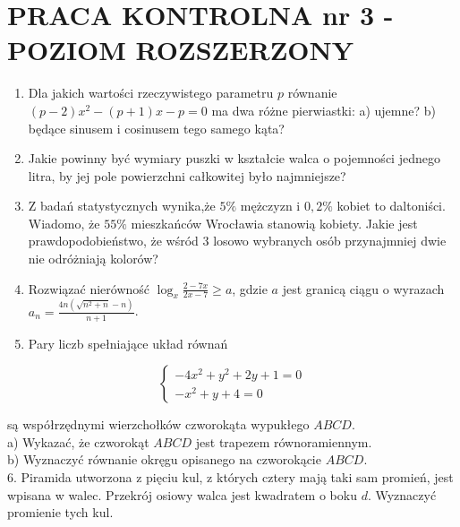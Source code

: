 \documentclass[10pt]{article}
\begin{document}
\section*{PRACA KONTROLNA nr 3 - POZIOM ROZSZERZONY}
\begin{enumerate}
  \item Dla jakich wartości rzeczywistego parametru $p$ równanie $(p-2) x^{2}-(p+1) x-p=0$ ma dwa różne pierwiastki: a) ujemne? b) będące sinusem i cosinusem tego samego kąta?
  \item Jakie powinny być wymiary puszki w kształcie walca o pojemności jednego litra, by jej pole powierzchni całkowitej było najmniejsze?
  \item Z badań statystycznych wynika,że $5 \%$ mężczyzn i $0,2 \%$ kobiet to daltoniści. Wiadomo, że $55 \%$ mieszkańców Wrocławia stanowią kobiety. Jakie jest prawdopodobieństwo, że wśród 3 losowo wybranych osób przynajmniej dwie nie odróżniają kolorów?
  \item Rozwiązać nierówność $\log _{x} \frac{2-7 x}{2 x-7} \geqslant a$, gdzie $a$ jest granicą ciągu o wyrazach $a_{n}=\frac{4 n\left(\sqrt{n^{2}+n}-n\right)}{n+1}$.
  \item Pary liczb spełniające układ równań
\end{enumerate}

$$
\left\{\begin{array}{r}
-4 x^{2}+y^{2}+2 y+1=0 \\
-x^{2}+y+4=0
\end{array}\right.
$$

są współrzędnymi wierzchołków czworokąta wypukłego $A B C D$.\\
a) Wykazać, że czworokąt $A B C D$ jest trapezem równoramiennym.\\
b) Wyznaczyć równanie okręgu opisanego na czworokącie $A B C D$.\\
6. Piramida utworzona z pięciu kul, z których cztery mają taki sam promień, jest wpisana w walec. Przekrój osiowy walca jest kwadratem o boku $d$. Wyznaczyć promienie tych kul.
\end{document}
